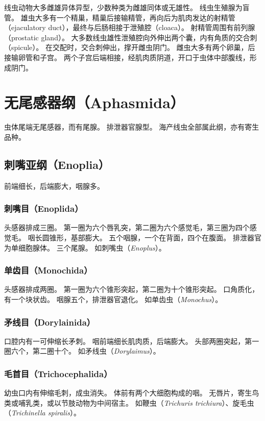 \documentclass[11pt]{article}
\begin{document}
线虫动物大多雌雄异体异型，少数种类为雌雄同体或无雄性。
线虫生殖腺为盲管。
雄虫大多有一个精巢，精巢后接输精管，再向后为肌肉发达的射精管（ejaculatory duct），最终与后肠相接于泄殖腔（cloaca）。
射精管周围有前列腺（prostatic gland）。
大多数线虫雄性泄殖腔向外伸出两个囊，内有角质的交合刺（spicule）。
在交配时，交合刺伸出，撑开雌虫阴门。
雌虫大多有两个卵巢，后接输卵管和子宫。
两个子宫后端相接，经肌肉质阴道，开口于虫体中部腹线，形成阴门。
  
\section{无尾感器纲（Aphasmida）}
虫体尾端无尾感器，而有尾腺。
排泄器官腺型。
海产线虫全部属此纲，亦有寄生品种。

\subsection{刺嘴亚纲（Enoplia）}
前端细长，后端膨大，咽腺多。

\subsubsection{刺嘴目（Enoplida）}
头感器排成三圈。
第一圈为六个唇乳突，第二圈为六个感觉毛，第三圈为四个感觉毛。
咽长圆锥形，基部膨大。
五个咽腺，一个在背面，四个在腹面。
排泄器官为单细胞腺体。
三个尾腺。
如刺嘴虫（\textit{Enoplus}）。

\subsubsection{单齿目（Monochida）}
头感器排成两圈。
第一圈为六个锥形突起，第二圈为十个锥形突起。
口角质化，有一个块状齿。
咽腺五个，排泄器官退化。
如单齿虫（\textit{Monochus}）。

\subsubsection{矛线目（Dorylainida）}
口腔内有一可伸缩长矛刺。
咽前端细长肌肉质，后端膨大。
头部两圈突起，第一圈六个，第二圈十个。
如矛线虫（\textit{Dorylaimus}）。

\subsubsection{毛首目（Trichocephalida）}
幼虫口内有伸缩毛刺，成虫消失。
体前有两个大细胞构成的咽。
无唇片，寄生鸟类或哺乳类，或以节肢动物为中间宿主。
如鞭虫（\textit{Trichuris trichiura}）、旋毛虫（\textit{Trichinella spiralis}）。
\end{document}
